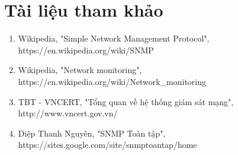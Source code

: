 \documentclass[12pt,oneside,a4paper]{article}
\begin{document}
\newpage
\section*{Tài liệu tham khảo}
%
%
\begin{enumerate}
\item{Wikipedia, "Simple Network Management Protocol", https://en.wikipedia.org/wiki/SNMP}
\item{Wikipedia, "Network monitoring", https://en.wikipedia.org/wiki/Network\_monitoring}
\item{TBT - VNCERT, "Tổng quan về hệ thống giám sát mạng", http://www.vncert.gov.vn/}
\item{Diệp Thanh Nguyên, "SNMP Toàn tập", https://sites.google.com/site/snmptoantap/home}
\end{enumerate}
	
\end{document}
